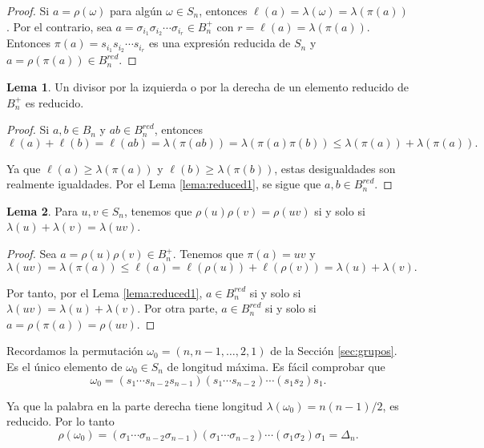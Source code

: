 \documentclass[12pt]{book}
\theoremstyle{definition}
\newtheorem{lema}{Lema}[section]
\begin{document}
\begin{proof} Si $a=\rho(\omega)$ para algún $\omega\in S_n$, entonces $\ell(a)=\lambda(\omega)=\lambda(\pi(a))$. Por el contrario, sea $a=\sigma_{i_1}\sigma_{i_2}\cdots \sigma_{i_r}\in B_n^+$ con $r=\ell(a)=\lambda(\pi(a))$. Entonces $\pi(a)=s_{i_1}s_{i_2}\cdots s_{i_r}$ es una expresión reducida de $S_n$ y $a=\rho(\pi(a))\in B_n^{red}$.
\end{proof}

\begin{lema}
Un divisor por la izquierda o por la derecha de un elemento reducido de $B_n^+$ es reducido.
\label{lema:reduced2}
\end{lema}

\begin{proof} Si $a,b\in B_n$ y $ab\in B_n^{red}$, entonces
$$\ell(a) + \ell(b)= \ell(ab)=\lambda(\pi(ab))=\lambda(\pi(a)\pi(b))\leq \lambda(\pi(a))+\lambda(\pi(a)).$$

Ya que $\ell(a)\geq \lambda(\pi(a))$ y $\ell(b)\geq \lambda(\pi(b))$, estas desigualdades son realmente igualdades. Por el Lema \ref{lema:reduced1}, se sigue que $a,b\in B_n^{red}$.\end{proof}

\begin{lema}
Para $u,v\in S_n$, tenemos que $\rho(u)\rho(v)=\rho(uv)$ si y solo si $\lambda(u)+\lambda(v)=\lambda(uv)$.
\label{lema:longi}
\end{lema}

\begin{proof} Sea $a=\rho(u)\rho(v)\in B_n^+$. Tenemos que $\pi(a)= uv$ y 
$$\lambda(uv)=\lambda(\pi(a))\leq\ell(a)=\ell(\rho(u))+\ell(\rho(v))=\lambda(u)+\lambda(v).$$

Por tanto, por el Lema \ref{lema:reduced1}, $a\in B_n^{red}$ si y solo si $\lambda(uv)=\lambda(u)+\lambda(v)$. Por otra parte, $a\in B_n^{red}$ si y solo si $a=\rho(\pi(a))=\rho(uv)$.
\end{proof}


Recordamos la permutación $\omega_0=(n,n-1,\ldots,2,1)$ de la Sección \ref{sec:grupos}. Es el único elemento de $\omega_0\in S_n$ de longitud máxima. Es fácil comprobar que
$$\omega_0=(s_1\cdots s_{n-2}s_{n-1})(s_1\cdots s_{n-2})\cdots(s_1s_2)s_1.$$

Ya que la palabra en la parte derecha tiene longitud $\lambda(\omega_0)=n(n-1)/2$, es reducido. Por lo tanto
$$\rho(\omega_0)=(\sigma_1\cdots \sigma_{n-2}\sigma_{n-1})(\sigma_1\cdots \sigma_{n-2})\cdots(\sigma_1\sigma_2)\sigma_1=\Delta_n.$$
\end{document}
